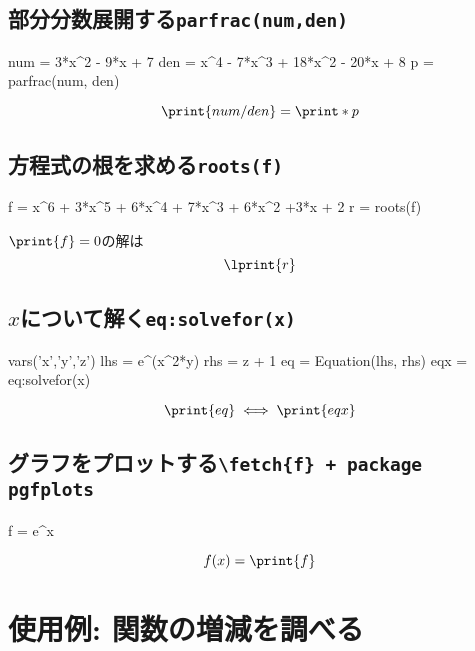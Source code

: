 \documentclass{jlreq}
\begin{document}
\subsection{部分分数展開する\quad\texttt{parfrac(num,den)}}
\begin{CAS}
	num = 3*x^2 - 9*x + 7
	den = x^4 - 7*x^3 + 18*x^2 - 20*x + 8
	p = parfrac(num, den)
\end{CAS}
\[\print{num/den}=\print*{p}\]


\subsection{方程式の根を求める\quad\texttt{roots(f)}}
\begin{CAS}
	f = x^6 + 3*x^5 + 6*x^4 + 7*x^3 + 6*x^2 +3*x + 2
	r = roots(f)
\end{CAS}
$\print{f}=0$の解は
\[\lprint{r}\]


\subsection{$x$について解く\quad\texttt{eq:solvefor(x)}}
\begin{CAS}
	vars('x','y','z')
	lhs = e^(x^2*y)
	rhs = z + 1
	eq = Equation(lhs, rhs)
	eqx = eq:solvefor(x)
\end{CAS}
\[\print{eq}\iff\print{eqx}\]

\newpage

\subsection{グラフをプロットする\quad\texttt{\textbackslash fetch\{f\} + package pgfplots}}
\begin{CAS}
	f = e^x
\end{CAS}
\[f(x)=\print{f}\]
\begin{figure}[H]
	\centering
\end{figure}

\newpage

\section{使用例: 関数の増減を調べる}
\end{document}
